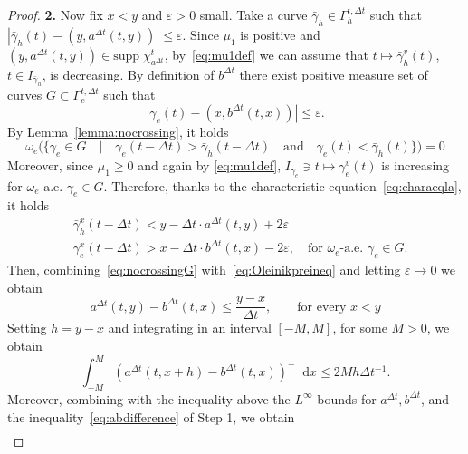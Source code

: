 \documentclass[11pt, twoside, reqno]{amsart}
\theoremstyle{definition}
\theoremstyle{remark}
\numberwithin{equation}{section}
\newcommand*\dif{\mathop{}\!\mathrm{d}}
\newcommand{\mr}[1]{\mathrm{#1}}
\begin{document}
\begin{proof}
\vspace{0.5cm}
\textbf{2.}
Now fix $x < y$ and $\varepsilon> 0$ small. Take a curve $\bar \gamma_h \in \Gamma_h^{t, \Delta t}$ such that $|\bar \gamma_h(t) -(y, a^{\Delta t}(t,y))| \leq \varepsilon$. Since $\mu_1$ is positive and $(y, a^{\Delta t}(t,y)) \in \mr{supp} \; \chi_{a^{\Delta t}}^t$, by~\eqref{eq:mu1def} we can assume that $t \mapsto \bar \gamma_h^v(t)$, $t \in I_{\bar \gamma_h}$, is decreasing.
By definition of $b^{\Delta t}$ there exist positive measure set of curves $G \subset \Gamma_e^{t, \Delta t}$ such that  $$|\gamma_e(t)-(x, b^{\Delta t}(t,x))| \leq \varepsilon.$$
By Lemma~\ref{lemma:nocrossing}, it holds
\begin{equation}\label{eq:nocrossingG}
\omega_e\Big( \Big\{ \gamma_e \in G \quad \big| \quad \gamma_e(t-\Delta t) >\bar \gamma_h(t-\Delta t) \quad \text{and} \quad \gamma_e(t) < \bar \gamma_h(t)\Big\}\Big) = 0
\end{equation}
Moreover, since $\mu_1 \geq 0$ and again by \eqref{eq:mu1def}, $I_{\gamma_e} \ni t \mapsto \gamma^v_e(t)$ is increasing for $\omega_e$-a.e. $\gamma_e \in G$. Therefore, thanks to the characteristic equation~\eqref{eq:charaeqla}, it holds
\begin{equation}\label{eq:Oleinikpreineq}
\begin{aligned}
    &\bar \gamma_h^x(t-\Delta t) < y -\Delta t\cdot a^{\Delta t}(t, y) + 2\varepsilon\\
    & \gamma_e^x(t-\Delta t) > x -\Delta t\cdot b^{\Delta t}(t, x) - 2\varepsilon, \quad \text{for $\omega_e$-a.e. $\gamma_e \in G$}.
    \end{aligned}
\end{equation}
Then, combining~\eqref{eq:nocrossingG} with~\eqref{eq:Oleinikpreineq} and letting $\varepsilon \to 0$ we obtain
\begin{equation}
    a^{\Delta t}(t, y) -b^{\Delta t}(t, x) \leq \frac{y-x}{\Delta t} , \qquad \text{for every $x < y$}
\end{equation}
Setting $h = y-x$ and integrating in an interval $[-M, M]$, for some $M > 0$, we obtain
\begin{equation}
    \int_{-M}^M (a^{\Delta t}(t, x+h)-b^{\Delta t}(t, x) )^+ \dif x \leq 2 M h \Delta t^{-1}.
\end{equation}
Moreover, combining with the inequality above the $L^{\infty}$ bounds for $a^{\Delta t}, b^{\Delta t}$,  and the inequality~\eqref{eq:abdifference} of Step 1, we obtain
\begin{equation}
    \begin{aligned}

\end{aligned}
\end{equation}
\end{proof}
\end{document}
